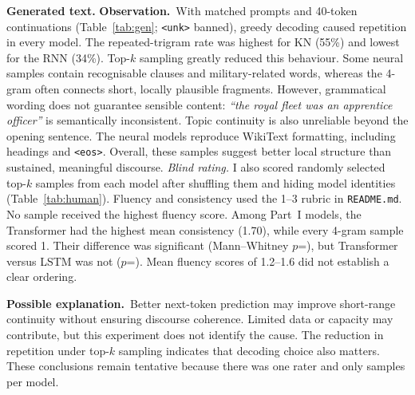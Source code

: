 \documentclass[10pt]{article}
\newcommand{\obs}{\textbf{Observation.}~}
\newcommand{\hyp}{\par\textbf{Possible explanation.}~}
\begin{document}
\textbf{Generated text.} \obs With matched prompts and 40-token continuations (Table~\ref{tab:gen};
\texttt{<unk>} banned), greedy decoding caused repetition in every model. The repeated-trigram rate was highest for
KN (55\%) and lowest for the RNN (34\%). Top-$k$ sampling greatly reduced this behaviour. Some neural samples
contain recognisable clauses and military-related words, whereas the 4-gram often connects short, locally
plausible fragments. However, grammatical wording does not guarantee sensible content: \emph{``the royal fleet was
an apprentice officer''} is semantically inconsistent. Topic continuity is also unreliable beyond the opening
sentence. The neural models reproduce WikiText formatting, including headings and \texttt{<eos>}. Overall, these
samples suggest better local structure than sustained, meaningful discourse.
\emph{Blind rating.} I also scored \heItems{} randomly selected top-$k$ samples from each model after shuffling
them and hiding model identities (Table~\ref{tab:human}). Fluency and consistency used the 1--3 rubric in
\texttt{README.md}. No sample received the highest fluency score. Among Part~I models, the Transformer had the
highest mean consistency (1.70), while every 4-gram sample scored 1. Their difference was significant
(Mann--Whitney $p$=\heTrNgCon), but Transformer versus LSTM was not ($p$=\heTrLstmCon). Mean fluency scores of
1.2--1.6 did not establish a clear ordering. \hyp Better next-token prediction may improve short-range continuity
without ensuring discourse coherence. Limited data or capacity may contribute, but this experiment does not identify
the cause. The reduction in repetition under top-$k$ sampling indicates that decoding choice also matters. These
conclusions remain tentative because there was one rater and only \heItems{} samples per model.

\begin{table}[h]
\centering\footnotesize

\caption{Matched continuations (more in \texttt{results/generations.md}).}
\label{tab:gen}
\end{table}

\begin{table}[h]
\centering\footnotesize

\caption{Blind human rating of top-$k$ samples (one rater, \heItems{} samples per model, 1--3 scale): mean and
bootstrap 95\% CI.}
\label{tab:human}
\end{table}
\end{document}

